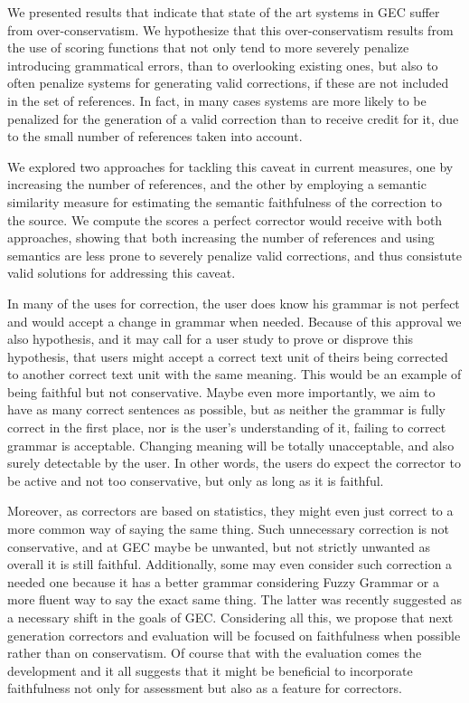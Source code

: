 \documentclass[letter,11pt]{article}
\begin{document}
{We presented results that indicate that state of the art systems in GEC suffer from
over-conservatism. We hypothesize that this over-conservatism results from the use
of scoring functions that not only tend to more severely penalize introducing
grammatical errors, than to overlooking existing ones, but also to often penalize
systems for generating valid corrections, if these are not included in the set of references.
In fact, in many cases systems are more likely to be penalized for the generation of
a valid correction than to receive credit for it, due to the small number of references
taken into account.

We explored two approaches for tackling this caveat in current measures, one by
increasing the number of references, and the other by employing a semantic similarity
measure for estimating the semantic faithfulness of the correction to the source.
We compute the scores a perfect corrector would receive with both approaches, showing
that both increasing the number of references and using semantics 
are less prone to severely
penalize valid corrections, and thus consistute valid solutions for addressing this caveat.

In many of the uses for correction, the user does know his grammar
is not perfect and would accept a change in grammar when needed.
Because of this approval we also
hypothesis, and it may call for a user study to prove or disprove
this hypothesis, that users might accept a correct text unit of theirs
being corrected to another correct text unit with the same meaning.
This would be an example of being faithful but not conservative.
Maybe even more importantly, we aim to have as many correct sentences
as possible, but as neither the grammar is fully correct in the first place,
nor is the user's understanding of it, failing to correct grammar
is acceptable. Changing meaning will be totally unacceptable, and
also surely detectable by the user. In other words, the users do expect
the corrector to be active and not too conservative, but
only as long as it is faithful. 

Moreover, as correctors are based on statistics, they might even
just correct to a more common way of saying the same thing. Such unnecessary
correction is not conservative, and at GEC maybe be unwanted, but not strictly unwanted as overall
it is still faithful. Additionally, some may even
consider such correction a needed one because it has a better grammar considering
Fuzzy Grammar\cite{lakoff1973fuzzy,madnani2011they} or a more fluent
way to say the exact same thing. The latter was recently suggested as a necessary
shift in the goals of GEC\cite{sakaguchi2016reassessing}.
Considering all this, we propose that next generation correctors and evaluation will be focused on faithfulness
when possible rather than on conservatism. Of course that with the evaluation comes the development
and it all suggests that it might be beneficial to incorporate faithfulness not only for assessment
but also as a feature for correctors. 



}
\end{document}
